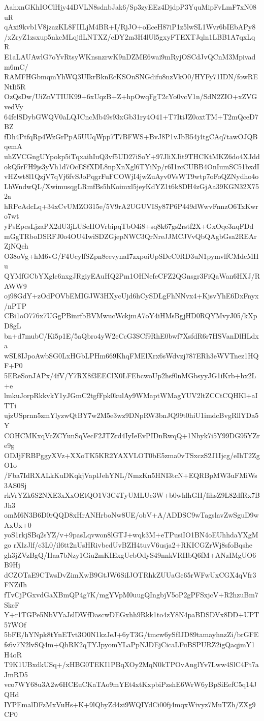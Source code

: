 AahxnGKhIOClHjy44DVLN8sdnbJak6/Sp3zyEEz4DjdpP3YquMipFvLmF7xN08uR
qAxi9kvb1V8jzazKL8FIILjM4BR+I/RjJO+oEceH87iP1z5lwSL1Wvr6bIEbAPy8
/xZryZ1zsxup5nkcMLqjflLNTXZ/cDY2m3H4lUl5gxyFTEXTJqln1LBB1A7qxLqR
E1aLAUAwlG7oYvRtsyWKnsnzrwK9nDZME6wai9mRyjOSCdJvQCnM3Mpivadm6mC/
RAMFHGbmqmYhWQ3UIkrBknEcKSOnSNGdifu8nzVkO0/HYFy71IDN/fowRENtIi5R
OzQsDw/UiZnVTIUK99+6xUqzB+Z+hpOwqFgT2cYo0vcV1n/SdN2ZIO+xZVGvedVy
64felSDybGWQV0aLQJCncMb49s93xGb31ry4O41+T7ItiJZ0oxtTM+T2mQceD7BZ
fDh4PtfqRp4WzGrPpA5UUqWpp7T7BFWS+BvJ8P1vJbB54j4tgCAq7tawOJQBqemA
uhZVCGngUYpokp5iTqxaihIuQ3vf5UD27iSoY+97JliXJit9THCKtMKZ6do4XJdd
okQ5rFH9js3yVh1d7OcESfXDL8npXnXgl6TYiNp/r6I1rcCUBB4OnIumSC51bxdI
vHZwt8l1QzjV7qVj6fvSJoPqgrFuFCOWjI4jwZuAyv0VsWT9wtp7oFoQZNydho4o
LhWndwQL/XwimusqgLRmfBs5hKoimxl5jeyKdYZ1t6k8DH4zGjAa39KGN32X752a
hRPcAdcLq+34xCvUMZO315e/5V9rA2UGUVISy87P6P449dWwvFnnzO6TxKwro7wt
yPsEpcsLjzaPX2dU3jLUSeHOVrbipqTbO4i8+sq8k67gs2rstf2X+GxOqe3nqFDd
mGgTRboDSRFJ0o4OU4IwiSDZGjepNWC3QrNreJJMCJVvQbQAgbGsa2REArZjNQch
O38oVg+hM6vG/F4UcylfSZpn8cevynaI7zxpoiUpSDeC0RD3uN1pymvlfCMdcMHu
QYMfGCbYXglc6nxgJRgiyEAuHQ2Pm1OHNefeCFZ2QGnsgr3FiQaWan6HXJ/RAWW9
oj98GdY+zOdPOVbEMIGJW3HXycUjd6hCySDLgFhNNvx4+KjsvYhE6DxFnyx/nPTP
CBi1oO776x7UGgPBinrfbBVMwucWckjmA7oY4iHMsBgjHD0RQYMvyJ05/kXpD8gL
bn+d7mubC/Ki5p1E/5aQbro4yW2eCcG3SCf9RhE0bwf7XsfdR6r7HSVanDlHLdxa
wSL8IJpoAwbSG0LxHGbLPHm669KhqFMElXrx6sWdvzj787ERh3eWVTnez1HQF+P0
5EReSonJAPx/4fV/Y7RX8f3EEClX0LFEbcwoUp2hsf0nMGbsyyJG1iKrb+hx2L+e
lmkuJorpRkkvkY1yJGmC2tgfFpk0kulAy9WMaptWMagYUV2ltZCCtCQHKl+aITTi
ujzUSprnn5zmYlyzwQtBY7w2M5e3wz9DNpRW3bnJQ99t0hiU1imdcBvgRllYDa5Y
COHCMKxqVcZCYunSqVecF2JTZrd4IyIeEvPIDnRwqQ+1Nhyk7i5Y99DG95YZre9g
ODJjFRBPggyXVz+XXoTK5KR2YAXVLOT0bE5zma0vTSxczS2J1Ijcg/eIhT2ZgO1o
/Fba7IdRXALkKuDKqkjVaplJehYNL/NmzKn5HNI3tcN+EQRBpMW3uFMiWs3AS0Sj
rkVrYZk6S2NXE3xXxOEtQO1V3C4TyUMLUc3W+b0whlhGH/fihsZ9L82dfRx7BJh3
omM6N3B6D0rQQD8xHrANHrboNw8UE/obV+A/ADDSC9wTagslavZwSguD9wAxUx+0
yoS1rkjSBq2sYZ/v+9pasLqvwon8lGTJ+wqk3M+eTPusiIO1BN4oEUhhdaYXgMgo
rXlzJlf/c3L0/il6tt2nUsHRivbcdUvBZH4tuvV6usja2+RKICGZrWj8sfoBqshe
gh3jZVzBgQ/Haa7bNzy1Giu2mKIExgUcbOdyS49nnkVRHbQ6fM+ANzIMgUO6B9Hj
dCZOTaE9CTwsDvZimXwB9GtJW6SiIJOTRhkZUUaGc65rWFwUxCGX4qVfr3FNZiIh
fTvCjPGxvdGaXBmQP4g7K/mgYVpM0uugQIngbjV5oP2gPFSxjcV+R2hzuBm7SkcF
Y+r1TGPe5NbVYaJslDWfDascwDEGxhh9Rkk1to4zY8N4paBDSDVx8DD+UPT57WOf
5bFE/hYNpk8tYnETvt3O0N1kzJeJ+6yT3G/tmcw6ySfIJD89tamayhnzZi/brGFE
fs6v7N2lvSQ4m+QhRK2qTYJpyomYLaPpNJDEjCicaLFuBSPURZ2igQaqjmY1H4oR
T9K1UBxdkUSq+/xHBG0TEKI1PBqXOy2MqN0kTPOvAnglYv7Lww4SlC4Pt7aJmRD5
vco7WY68u3A2w6HCEuCKaTAo9mYEt4xtKxpbiPzshE6WrW6yBpSiEefC5q14JQHd
IYPEmalDFzMxVuHs+K+9lQbyZd4zi9WQIYdCi00fj4mqxWivyz7MuTZh/ZXg9CP0

